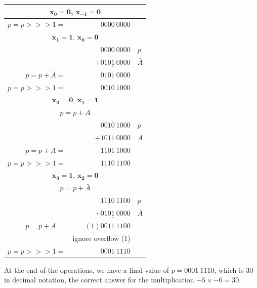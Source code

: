 \documentclass[titlepage]{article}
\begin{document}
\begin{table}[ht]
    \centering
    \begin{tabular}{rrl}
        \multicolumn{3}{c}{$\mathbf{x_0 = 0}$, $\mathbf{x_{-1} = 0}$} \\
        \midrule
        $p = p>>>1 =$ & $0000~0000$ & \\[15pt]


        \multicolumn{3}{c}{$\mathbf{x_1 = 1}$, $\mathbf{x_0 = 0}$} \\
        \midrule
                            &             $0000~0000$  & $p$ \\
                            & $\underline{+0101~0000}$ & $\bar{A}$ \\
        $p = p + \bar{A} =$ &             $0101~0000$  & \\[10pt]
        $p = p>>>1 =$       & $0010~1000$ & \\[15pt]


        \multicolumn{3}{c}{$\mathbf{x_2 = 0}$, $\mathbf{x_1 = 1}$} \\
        \midrule
        \multicolumn{3}{c}{$p = p + A$} \\
                      &             $0010~1000$  & $p$ \\
                      & $\underline{+1011~0000}$ & $A$ \\
        $p = p + A =$ &             $1101~1000$  & \\[10pt]
        $p = p>>>1 =$ & $1110~1100$ & \\[15pt]


        \multicolumn{3}{c}{$\mathbf{x_3 = 1}$, $\mathbf{x_2 = 0}$} \\
        \midrule
        \multicolumn{3}{c}{$p = p + \bar{A}$} \\
                            &             $1110~1100$  & $p$ \\
                            & $\underline{+0101~0000}$ & $\bar{A}$ \\
        $p = p + \bar{A} =$ &          $(1)0011~1100$  & \\
                            & \footnotesize{ignore overflow (1)} & \\[10pt]
        $p = p>>>1 =$       & $0001~1110$ & \\
    \end{tabular}
\end{table}

\FloatBarrier

At the end of the operations, we have a final value of $p = 0001~1110$, which is $30$ in decimal notation, the correct answer for the multiplication $-5 \times -6 = 30$.\par
\end{document}
